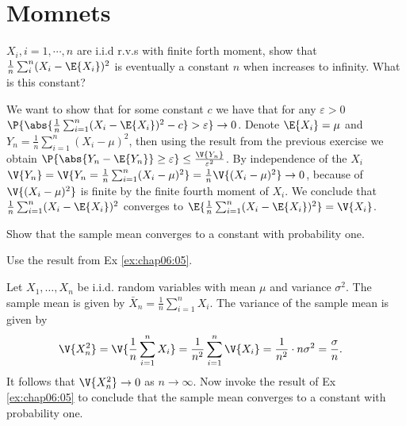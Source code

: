 \section{Momnets}
\label{sec:section-6.2}

	\begin{exercise}\label{ex:chap06:06}
$X_i, i=1,\cdots, n$ are i.i.d r.v.s with finite forth moment, show that $\frac{1}{n}\sum_i^n (X_i-\E{X_i})^2$ is eventually a constant $n$ when increases to infinity. What is this constant?
	\begin{solution}
		We want to show that for some constant $c$ we have that for any $\varepsilon>0$ $\P{\abs{\frac{1}{n}\sum_{i=1}^n(X_{i}-\E{X_i})^2-c}>\varepsilon}\rightarrow 0$. Denote $\E{X_i}=\mu$ and $Y_n=\frac{1}{n}\sum_{i=1}^n(X_{i}-\mu)^2$, then using the result from the previous exercise we obtain $\P{\abs{Y_n-\E{Y_n}}\geq\varepsilon}\leq \frac{\V{Y_n}}{\varepsilon^2}$. By independence of the $X_i$ $\V{Y_n}=\V{Y_n=\frac{1}{n}\sum_{i=1}^n(X_{i}-\mu)^2}=\frac{1}{n}\V{(X_i-\mu)^2}\rightarrow 0$, because of $\V{(X_i-\mu)^2}$ is finite by the finite fourth moment of $X_i$. We conclude that $\frac{1}{n}\sum_{i=1}^n(X_{i}-\E{X_i})^2$ converges to $\E{\frac{1}{n}\sum_{i=1}^n(X_{i}-\E{X_i})^2}=\V{X_i}$.
	\end{solution}
\end{exercise}


	
	\begin{exercise}
		Show that the sample mean converges to a constant with probability one. 
		\begin{hint}
			Use the result from Ex \ref{ex:chap06:05}.
		\end{hint}
		\begin{solution}
			Let $X_1, \ldots, X_n$ be i.i.d. random variables with mean $\mu$ and variance $\sigma^2$. The sample mean is given by $\bar{X}_n = \frac{1}{n} \sum_{i = 1}^n X_i$. The variance of the sample mean is given by
			\begin{align*}
				\V{X_n^2} & = \V{\frac{1}{n} \sum_{i = 1}^n X_i} = \frac{1}{n^2} \sum_{i = 1}^n \V{X_i} = \frac{1}{n^2} \cdot n \sigma^2 = \frac{\sigma}{n}.
			\end{align*}	
			It follows that $\V{X_n^2} \to 0$ as $n \to \infty$. Now invoke the result of Ex \ref{ex:chap06:05} to conclude that the sample mean converges to a constant with probability one.
		\end{solution}
	\end{exercise}
	
